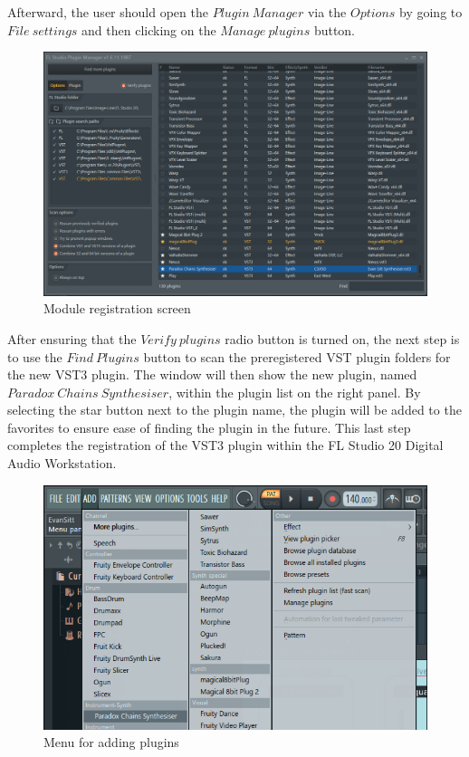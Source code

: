 \documentclass[a4paper,12pt]{report}
\begin{document}
Afterward, the user should open the $Plugin\ Manager$ via the $Options$ by going to $File\ settings$ and then clicking on the $Manage\ plugins$ button. 

\begin{figure} \centering
\includegraphics[width=36em]{ModuleRegistration.png}
    \caption{Module registration screen}     \label{fig:modulereg} \end{figure}

After ensuring that the $Verify\ plugins$ radio button is turned on, the next step is to use the $Find\ Plugins$ button to scan the preregistered VST plugin folders for the new VST3 plugin. The window will then show the new plugin, named $Paradox\ Chains\ Synthesiser$, within the plugin list on the right panel. By selecting the star button next to the plugin name, the plugin will be added to the favorites to ensure ease of finding the plugin in the future. This last step completes the registration of the VST3 plugin within the FL Studio 20 Digital Audio Workstation.

\begin{figure} \centering
\includegraphics[width=32em]{AddPluginList.png}
    \caption{Menu for adding plugins}     \label{fig:addplugin} \end{figure}
\end{document}
